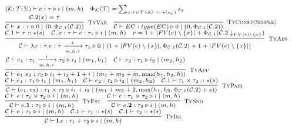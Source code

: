 \documentclass[fleqn]{article}
\begin{document}
\newcommand{\jtygc}[6]{#1 \vdash #2 : #3 \triangleright #4 \mid (#5, #6)}

\[
\scriptsize
\begin{array}{l}
	(\mathcal{K}; \mathcal{T}; \Sigma) \vdash e : \tau \triangleright i \mid (m, h) \hspace{1em}
	\Phi_{\mathcal{K}}(\mathcal{T}) = \sum_{x:\tau \in \mathcal{T} \land \mathcal{K} \vdash \tau :: \star(s_x)} s_x \\
	\infer[\textsc{TyVar}]{\jtygc{\mathcal{C}}{x}{\tau}{0}{0}{\Phi_{\mathcal{C}.1}(\mathcal{C}.2)}}{\mathcal{C}.2(x)=\tau} \hspace{1em}
	\infer[\textsc{TyConst(Simple)}]{\jtygc{\mathcal{C}}{EC}{type(EC)}{0}{0}{\Phi_{\mathcal{C}.1}(\mathcal{C}.2)}}{} \\
	\infer[\textsc{TyAbs}]{\jtygc{ \mathcal{C}}{ \lambda x:\tau. e}{ \tau \xrightarrow[m,h,r]{i} \tau_1 }{ 0 }{ 1 + |FV(e)\setminus \{ x \}| }{\Phi_{\mathcal{C}.1}(\mathcal{C}.2) + 1 + |FV(e)\setminus\{x\}|} }{\mathcal{C}.1 \vdash \tau :: \star(s) & \jtygc{\mathcal{C},x:\tau}{ e }{ \tau_1 }{ i }{ m }{h} & r = 1 + |FV(e)\setminus \{x\}| + \Phi_{\mathcal{C}.1}(\mathcal{C}.2 \downarrow_{FV(e) \setminus \{x\}})} \\
	\infer[\textsc{TyApp}]{\jtygc{\mathcal{C}} { e_1~e_2 } { \tau_2 } { i_1 + i_2 + 1 + i } { m_1 + m_2 + m }{\max(h_1,h_2,h)}}{\jtygc{\mathcal{C}} { e_1 }{ \tau_1 \xrightarrow[m,h,r]{i} \tau_2 }{ i_1 }{ m_1 }{h_1}& \jtygc{\mathcal{C}} { e_2 }{ \tau_1 }{ i_2 }{ m_2}{h_2}} \\
	\infer[\textsc{TyPair}]{\jtygc{\mathcal{C}}{ (e_1,e_2) }{ \tau_1 \times \tau_2 }{ i_1 + i_2 }{ m_1 + m_2 + 2}{\max(h_1,h_2,\Phi_{\mathcal{C}.1}(\mathcal{C}.2)+s)}}{\jtygc{\mathcal{C}}{  e_1 }{ \tau_1 }{ i_1 }{m_1}{h_1} & \jtygc{\mathcal{C} }{ e_2 }{ \tau_2 }{ i_2 }{ m_2}{h_2} & \mathcal{C}.1 \vdash \tau_1 \times \tau_2 :: \star(s)} \\
	\infer[\textsc{TyFst}]{\jtygc{\mathcal{C} }{ e.\mathbf{1} }{ \tau_1 }{ i }{ m}{h}}{\jtygc{\mathcal{C} }{ e }{ \tau_1 \times \tau_2 }{ i }{ m}{h}} \hspace{1em}
	\infer[\textsc{TySnd}]{\jtygc{\mathcal{C} }{ e.\mathbf{2} }{ \tau_2 }{ i }{ m}{h}}{\jtygc{\mathcal{C} }{ e }{ \tau_1 \times \tau_2 }{ i }{ m}{h}} \\
	\infer[\textsc{TyInl}]{\jtygc{\mathcal{C} }{ \mathbf{l}.e }{ \tau_1 + \tau_2 }{ i }{ m}{h}}{\jtygc{\mathcal{C} }{ e }{ \tau_1 }{ i }{ m }{h} & \mathcal{C}.1 \vdash \tau_1 :: \star(s) & \mathcal{C}.1 \vdash \tau_2 :: \star(s)} \\

\end{array}\]
\end{document}

